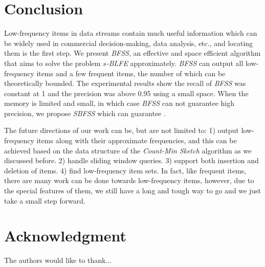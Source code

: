 \documentclass[conference]{IEEEtran}
\begin{document}
\section{Conclusion}
Low-frequency items in data streams contain much useful information which can be widely used in commercial decision-making, data analysis, etc., and locating them is the first step. We present \emph{BFSS}, an effective and space efficient algorithm that aims to solve the problem \emph{$s$-BLFE} approximately. \emph{BFSS} can output all low-frequency items and a few frequent items, the number of which can be theoretically bounded. The experimental results show the recall of \emph{BFSS} was constant at 1 and the precision was above 0.95 using a small space. When the memory is limited and small, in which case \emph{BFSS} can not guarantee high precision, we propose \emph{SBFSS} which can guarantee . \par
The future directions of our work can be, but are not limited to: 1) output low-frequency items along with their approximate frequencies, and this can be achieved based on the data structure of the \emph{Count-Min Sketch} algorithm as we discussed before. 2) handle sliding window queries. 3) support both insertion and deletion of items. 4) find low-frequency item sets. In fact, like frequent items, there are many work can be done towards low-frequency items, however, due to the special features of them, we still have a long and tough way to go and we just take a small step forward.








\section*{Acknowledgment}


The authors would like to thank...







%
%
%









\end{document}
